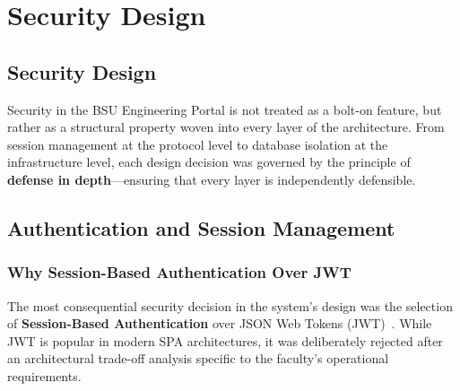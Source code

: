 
\chapter{Security Design}
\label{chap:security}
\newpage
\section*{Security Design}


Security in the BSU Engineering Portal is not treated as a bolt-on feature, but rather as a structural property woven into every layer of the architecture. From session management at the protocol level to database isolation at the infrastructure level, each design decision was governed by the principle of \textbf{defense in depth}---ensuring that every layer is independently defensible.

\section{Authentication and Session Management}
\label{sec:auth-session}

\subsection{Why Session-Based Authentication Over JWT}

The most consequential security decision in the system's design was the selection of \textbf{Session-Based Authentication} over JSON Web Tokens (JWT)~\cite{jwt}. While JWT is popular in modern SPA architectures, it was deliberately rejected after an architectural trade-off analysis specific to the faculty's operational requirements.

